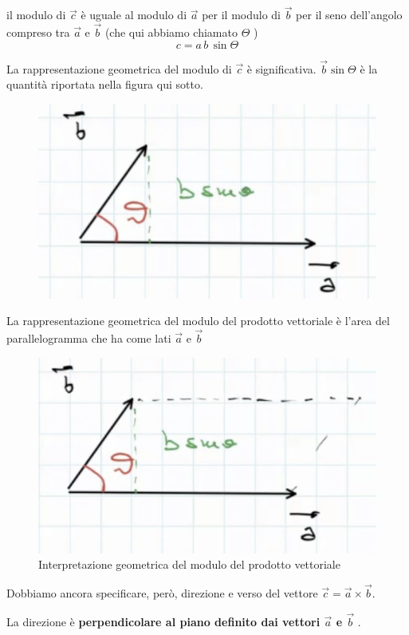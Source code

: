 \documentclass[a4paper]{book}
\begin{document}
il modulo di $ \overrightarrow{c} $ è uguale al modulo di $ \overrightarrow{a} $ per il modulo di $ \overrightarrow{b} $ per il seno dell'angolo compreso tra $\overrightarrow{a}$ e $ \overrightarrow{b} $ (che qui abbiamo chiamato $ \Theta $ )
$$ c = a \, b \,  \sin \Theta $$

\newpage
La rappresentazione geometrica del modulo di $ \overrightarrow{c} $ è significativa. $\overrightarrow{b} \sin \Theta $ è la quantità riportata nella figura qui sotto.

\begin{figure}[h]
\begin{center}
\includegraphics[width = 0.5 \textwidth]{vettoriale2}
\label{fig:vettoriale2}
\end{center}
\end{figure}

La rappresentazione geometrica del modulo del prodotto vettoriale è l'area del parallelogramma che ha come lati $ \overrightarrow{a} $ e $  \overrightarrow{b} $

\begin{figure}[h]
\begin{center}
\includegraphics[width = 0.5 \textwidth]{vettoriale3}
\caption{Interpretazione geometrica del modulo del prodotto vettoriale}
\label{fig:vettoriale3}
\end{center}
\end{figure}

Dobbiamo ancora specificare, però, direzione e verso del vettore $ \overrightarrow{c} = \overrightarrow{a} \times \overrightarrow{b} $.

La direzione è \textbf{perpendicolare al piano definito dai vettori $  \overrightarrow{a} $ e $ \overrightarrow{b} $} .
\end{document}
